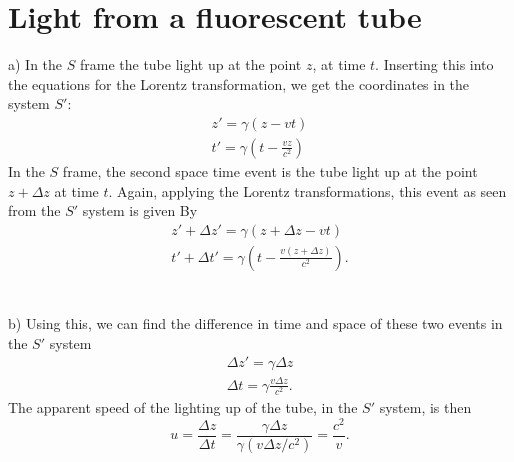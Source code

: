 \documentclass{article}
\begin{document}
    \section{Light from a fluorescent tube}
        a) In the $S$ frame the tube light up at the point $z$, at time $t$. Inserting this into the equations for the Lorentz transformation, we get the coordinates in the system $S'$:
        \begin{align*}
            z' = \gamma(z - v t) \\
            t' = \gamma\left(t - \frac{vz}{c^2}\right)
        \end{align*}
        In the $S$ frame, the second space time event is  the tube light up at the point $z + \Delta z$ at time $t$. Again, applying the Lorentz transformations, this event as seen from the $S'$ system is given By
        \begin{align*}
            z' + \Delta z' = \gamma (z + \Delta z - vt) \\
            t' + \Delta t' = \gamma \left(t - \frac{v(z + \Delta z)}{c^2}\right).
        \end{align*} \\ \\
        b) Using this, we can find the difference in time and space of these two events in the $S'$ system
        \begin{align*}
            \Delta z' = \gamma \Delta z \\
            \Delta t = \gamma \frac{v \Delta z}{c^2}.
        \end{align*}
        The apparent speed of the lighting up of the tube, in the $S'$ system, is then
        \begin{equation*}
            u = \frac{\Delta z}{\Delta t} = \frac{\gamma \Delta z}{\gamma (v \Delta z/c^2)} = \frac{c^2}{v}.
        \end{equation*}
\end{document}
